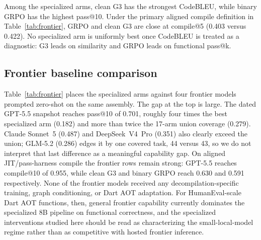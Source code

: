 \documentclass[11pt]{article}
\begin{document}
Among the specialized arms, clean G3 has the strongest CodeBLEU, while binary GRPO has the highest pass@10. Under the primary aligned compile definition in Table~\ref{tab:frontier}, GRPO and clean G3 are close at compile@5 (0.403 versus 0.422). No specialized arm is uniformly best once CodeBLEU is treated as a diagnostic: G3 leads on similarity and GRPO leads on functional pass@k.

\subsection{Frontier baseline comparison}
\label{sec:frontier}

Table~\ref{tab:frontier} places the specialized arms against four frontier models prompted zero-shot on the same assembly. The gap at the top is large. The dated GPT-5.5 snapshot reaches pass@10 of 0.701, roughly four times the best specialized arm (0.182) and more than twice the 17-arm union coverage (0.279). Claude Sonnet~5 (0.487) and DeepSeek~V4~Pro (0.351) also clearly exceed the union; GLM-5.2 (0.286) edges it by one covered task, 44 versus 43, so we do not interpret that last difference as a meaningful capability gap. On aligned JIT/pass-harness compile the frontier rows remain strong: GPT-5.5 reaches compile@10 of 0.955, while clean G3 and binary GRPO reach 0.630 and 0.591 respectively. None of the frontier models received any decompilation-specific training, graph conditioning, or Dart AOT adaptation. For HumanEval-scale Dart AOT functions, then, general frontier capability currently dominates the specialized 8B pipeline on functional correctness, and the specialized interventions studied here should be read as characterizing the small-local-model regime rather than as competitive with hosted frontier inference.
\end{document}
